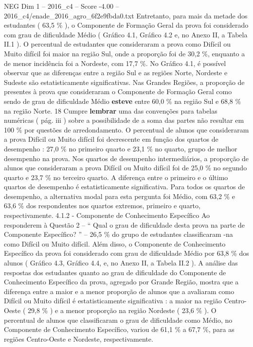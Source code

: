 \begin{textsample}{NEG Dim 1 – 2016\_c4 – Score -4.00 – 2016\_c4/enade\_2016\_agro\_6f2e9fbda0.txt}
Entretanto, para mais da metade dos estudantes ( 63,5 \% ), o Componente de Formação Geral da prova foi considerado com grau de dificuldade Médio ( Gráfico 4.1, Gráfico 4.2 e, no Anexo II, a Tabela II.1 ).
O percentual de estudantes que consideraram a prova como Difícil ou Muito difícil foi maior na região Sul, onde a proporção foi de 30,2 \%, enquanto a de menor incidência foi a Nordeste, com 17,7 \%.
No Gráfico 4.1, é possível observar que as diferenças entre a região Sul e as regiões Norte, Nordeste e Sudeste são estatisticamente significativas.
Nas Grandes Regiões, a proporção de presentes à prova que consideraram o Componente de Formação Geral como sendo de grau de dificuldade Médio \textbf{esteve} entre 60,0 \% na região Sul e 68,8 \% na região Norte. 18 Cumpre \textbf{lembrar} uma das convenções para tabelas numéricas ( pág. iii ) sobre a possibilidade de a soma das partes não resultar em 100 \% por questões de arredondamento.
O percentual de alunos que consideraram a prova Difícil ou Muito difícil foi decrescente em função dos quartos de desempenho : 27,0 \% no primeiro quarto e 23,1 \% no quarto, grupo de melhor desempenho na prova.
Nos quartos de desempenho intermediários, a proporção de alunos que consideraram a prova Difícil ou Muito difícil foi de 25,0 \% no segundo quarto e 23,7 \% no terceiro quarto.
A diferença entre o primeiro e o último quartos de desempenho é estatisticamente significativa.
Para todos os quartos de desempenho, a alternativa modal para esta pergunta foi Médio, com 63,2 \% e 63,6 \% dos respondentes nos quartos extremos, primeiro e quarto, respectivamente. 4.1.2 - Componente de Conhecimento Específico Ao responderem à Questão 2 – “ Qual o grau de dificuldade desta prova na parte de Componente Específico? ” – 26,5 \% do grupo de estudantes classificaram -na como Difícil ou Muito difícil.
Além disso, o Componente de Conhecimento Específico da prova foi considerado com grau de dificuldade Médio por 63,8 \% dos alunos ( Gráfico 4.3, Gráfico 4.4, e, no Anexo II, a Tabela II.2 ).
A análise das respostas dos estudantes quanto ao grau de dificuldade do Componente de Conhecimento Específico da prova, agregado por Grande Região, mostra que a diferença entre a maior e a menor proporção de alunos que a avaliaram como Difícil ou Muito difícil é estatisticamente significativa : a maior na região Centro-Oeste ( 29,8 \% ) e a menor proporção na região Nordeste ( 23,6 \% ).
O percentual de alunos que classificaram o grau de dificuldade como Médio, no Componente de Conhecimento Específico, variou de 61,1 \% a 67,7 \%, para as regiões Centro-Oeste e Nordeste, respectivamente.

\end{textsample}
